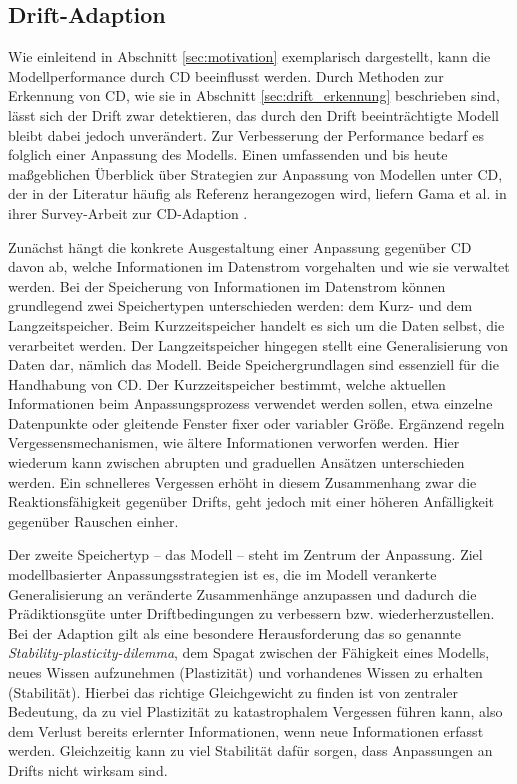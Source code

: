 \subsection{Drift-Adaption} \label{sec:drift_adaption}
Wie einleitend in Abschnitt \ref{sec:motivation} exemplarisch dargestellt, kann die Modellperformance durch \ac{CD} beeinflusst werden. Durch Methoden zur Erkennung von \ac{CD}, wie sie in Abschnitt \ref{sec:drift_erkennung} beschrieben sind, lässt sich der Drift zwar detektieren, das durch den Drift beeinträchtigte Modell bleibt dabei jedoch unverändert. Zur Verbesserung der Performance bedarf es folglich einer Anpassung des Modells. 
Einen umfassenden und bis heute maßgeblichen Überblick über Strategien zur Anpassung von Modellen unter \ac{CD}, der in der Literatur häufig als Referenz herangezogen wird, liefern Gama et al. in ihrer Survey-Arbeit zur \ac{CD}-Adaption \cite{gama.2014}. \par
Zunächst hängt die konkrete Ausgestaltung einer Anpassung gegenüber \ac{CD} davon ab, welche Informationen im Datenstrom vorgehalten und wie sie verwaltet werden. Bei der Speicherung von Informationen im Datenstrom können grundlegend zwei Speichertypen unterschieden werden: dem Kurz- und dem Langzeitspeicher. Beim Kurzzeitspeicher handelt es sich um die Daten selbst, die verarbeitet werden. Der Langzeitspeicher hingegen stellt eine Generalisierung von Daten dar, nämlich das Modell. Beide Speichergrundlagen sind essenziell für die Handhabung von \ac{CD}. 
Der Kurzzeitspeicher bestimmt, welche aktuellen Informationen beim Anpassungsprozess verwendet werden sollen, etwa einzelne Datenpunkte oder gleitende Fenster fixer oder variabler Größe. Ergänzend regeln Vergessensmechanismen, wie ältere Informationen verworfen werden. Hier wiederum kann zwischen abrupten und graduellen Ansätzen unterschieden werden. Ein schnelleres Vergessen erhöht in diesem Zusammenhang zwar die Reaktionsfähigkeit gegenüber Drifts, geht jedoch mit einer höheren Anfälligkeit gegenüber Rauschen einher. \par
Der zweite Speichertyp – das Modell – steht im Zentrum der Anpassung. Ziel modellbasierter Anpassungsstrategien ist es, die im Modell verankerte Generalisierung an veränderte Zusammenhänge anzupassen und dadurch die Prädiktionsgüte unter Driftbedingungen zu verbessern bzw. wiederherzustellen. Bei der Adaption gilt als eine besondere Herausforderung das so genannte \emph{Stability-plasticity-dilemma}, dem Spagat zwischen der Fähigkeit eines Modells, neues Wissen aufzunehmen (Plastizität) und vorhandenes Wissen zu erhalten (Stabilität). Hierbei das richtige Gleichgewicht zu finden ist von zentraler Bedeutung, da zu viel Plastizität zu katastrophalem Vergessen führen kann, also dem Verlust bereits erlernter Informationen, wenn neue Informationen erfasst werden. Gleichzeitig kann zu viel Stabilität dafür sorgen, dass Anpassungen an Drifts nicht wirksam sind. \par
